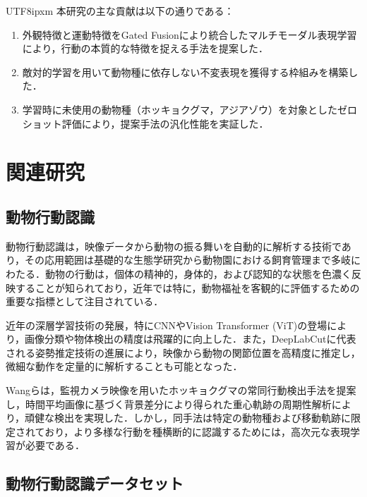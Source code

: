 \documentclass[twocolumn]{svjour3}
\begin{document}
\begin{CJK}{UTF8}{ipxm}
本研究の主な貢献は以下の通りである：
\begin{enumerate}
  \item 外観特徴と運動特徴をGated Fusionにより統合したマルチモーダル表現学習により，行動の本質的な特徴を捉える手法を提案した．
  \item 敵対的学習を用いて動物種に依存しない不変表現を獲得する枠組みを構築した．
  \item 学習時に未使用の動物種（ホッキョクグマ，アジアゾウ）を対象としたゼロショット評価により，提案手法の汎化性能を実証した．
\end{enumerate}

\section{関連研究}
\label{sec:related}

\subsection{動物行動認識}

動物行動認識は，映像データから動物の振る舞いを自動的に解析する技術であり，その応用範囲は基礎的な生態学研究から動物園における飼育管理まで多岐にわたる．動物の行動は，個体の精神的，身体的，および認知的な状態を色濃く反映することが知られており\cite{broom1986indicators}，近年では特に，動物福祉を客観的に評価するための重要な指標として注目されている\cite{mellor2017updating}．

近年の深層学習技術の発展，特にCNNやVision Transformer (ViT)\cite{dosovitskiy2020vit}の登場により，画像分類や物体検出の精度は飛躍的に向上した．また，DeepLabCut\cite{mathis2018deeplabcut}に代表される姿勢推定技術の進展により，映像から動物の関節位置を高精度に推定し，微細な動作を定量的に解析することも可能となった．

Wangら\cite{wang2023polarbear}は，監視カメラ映像を用いたホッキョクグマの常同行動検出手法を提案し，時間平均画像に基づく背景差分により得られた重心軌跡の周期性解析により，頑健な検出を実現した．しかし，同手法は特定の動物種および移動軌跡に限定されており，より多様な行動を種横断的に認識するためには，高次元な表現学習が必要である\cite{bengio2013representation}．

\subsection{動物行動認識データセット}


\end{CJK}
\end{document}
